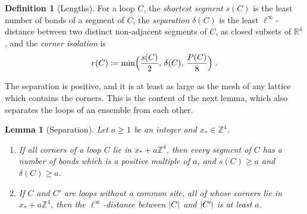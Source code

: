 \documentclass[11pt]{preprint}
\DeclarePairedDelimiter{\abs}{\lvert}{\rvert}
\numberwithin{equation}{section}
\newtheorem{lemma}[theorem]{Lemma}
\theoremstyle{definition}
\newtheorem{definition}[theorem]{Definition}
\theoremstyle{remark}
\theoremstyle{plain}
\begin{document}
\begin{definition}[Lengths]\label{def:lengths}
For a loop $C$, the \emph{shortest segment} $s(C)$ is the least number of bonds of a segment of $C$, the \emph{separation} $\delta(C)$ is the least $\ell^\infty$-distance between two distinct non-adjacent segments of $C$, as closed subsets of $\mathbb R^4$, and the \emph{corner isolation} is
\begin{equation}\label{eq:corner-isolation}
    r(C) \coloneqq \min\Bigl(\frac{s(C)}{2},\, \delta(C),\, \frac{P(C)}{8}\Bigr)\;.
\end{equation}
\end{definition}

The separation is positive, and it is at least as large as the mesh of any lattice which contains the corners. This is the content of the next lemma, which also separates the loops of an ensemble from each other.

\begin{lemma}[Separation]\label{lem:separation}
Let $a \geq 1$ be an integer and $x_* \in \mathbb Z^4$.
\begin{enumerate}[label=(\roman*)]
\item If all corners of a loop $C$ lie in $x_* + a\mathbb Z^4$, then every segment of $C$ has a number of bonds which is a positive multiple of $a$, and $s(C) \geq a$ and $\delta(C) \geq a$.
\item If $C$ and $C'$ are loops without a common site, all of whose corners lie in $x_* + a\mathbb Z^4$, then the $\ell^\infty$-distance between $\abs{C}$ and $\abs{C'}$ is at least $a$.
\end{enumerate}
\end{lemma}
\end{document}
